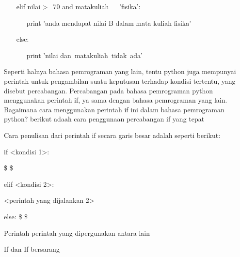 \vspace{12pt}
\noindent 
~~~ elif nilai >=70 and matakuliah=='fisika': \par
\vspace{12pt}
\noindent 
~~~~~~ print 'anda mendapat nilai B dalam mata kuliah fisika' \par
\vspace{12pt}
\noindent 
~~~ else: \par
\vspace{12pt}
\noindent 
~~~~~~ print 'nilai dan~matakuliah~tidak~ada'~~~     \par
\vspace{12pt}
\noindent 
Seperti halnya bahasa pemrograman yang lain, tentu python juga mempunyai perintah untuk pengambilan suatu keputusan terhadap kondisi tertentu, yang disebut percabangan. Percabangan pada bahasa pemrograman python menggunakan perintah if, ya sama dengan bahasa pemrograman yang lain. Bagaimana cara menggunakan perintah if ini dalam bahasa pemrograman python? berikut adaah cara penggunaan percabangan if yang tepat\par
\noindent 
\vspace{\baselineskip}
Cara penulisan dari perintah if secara garis besar adalah seperti berikut: \par
\noindent 
\vspace{\baselineskip}
\vspace{\baselineskip}
if <kondisi 1>: \par
\noindent 
\vspace{\baselineskip}
 \$  \$<perintah yang dijalankan 1> \par
\noindent 
\vspace{\baselineskip}
elif <kondisi 2>: \par
\noindent 
\vspace{\baselineskip}
<perintah yang dijalankan 2> \par
\noindent 
\vspace{\baselineskip}
else:\vspace{\baselineskip}
 \$  \$<perintah yang dijalankan 3> \par
\noindent 
\vspace{\baselineskip}
\vspace{\baselineskip}
Perintah-perintah yang dipergunakan antara lain \par
\noindent 
\vspace{\baselineskip}
If dan If bersarang \par
\noindent 
\vspace{\baselineskip}
